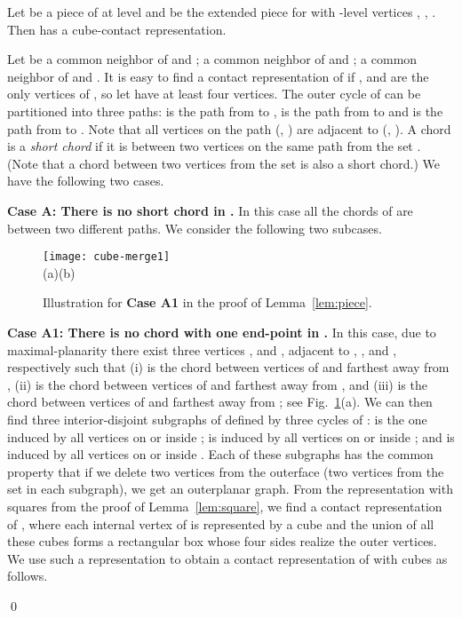 \documentclass{llncs}
\renewenvironment{proof}{\medskip\noindent{\bf Proof:}}{\mbox{}\hfill\qed\par}
\begin{document}
\begin{lemma}
	\label{lem:piece} Let  be a piece of  at level  and  be the
	extended piece for  with -level vertices , , . Then  has a
	cube-contact representation.
\end{lemma}
\begin{proof} Let  be a common neighbor of  and ;  a common neighbor of 
 and ;  a common neighbor of  and . It is easy to find a contact
 representation of  if ,  and  are the only vertices of
 , so let
  have at least four vertices. The outer cycle of  can be
 partitioned into three paths:  is the path from  to ,  is the path from  to
  and  is the path from  to . Note that all vertices on the path  (,
 ) are adjacent to  (, ). A chord  is a \textit{short chord} if it is between
 two vertices on the same path from the set . (Note that a chord between two
 vertices from the set  is also a short chord.) We have the following two cases.

\smallskip\noindent
\textbf{Case A: There is no short chord in .} In this case all the chords of  are between two
 different paths. We consider the following two subcases.




\begin{figure}[tb]
\centering
	\texttt{[image: cube-merge1]}\\
	(a)\hspace{0.38\textwidth}(b)\hspace{0.05\textwidth}
	\caption{Illustration for \textbf{Case A1} in the proof of Lemma~\ref{lem:piece}.}
	\label{fig:cube-merge1}
\end{figure}


\textbf{Case A1: There is no chord with one end-point in .} In this case, due to
 maximal-planarity there exist three vertices ,  and , adjacent to , , and ,
 respectively such that (i)  is the chord between vertices of  and  farthest
 away from , (ii)  is the chord between vertices of  and  farthest away
 from , and (iii)  is the chord between vertices of  and  farthest away
 from ; see Fig.~\ref{fig:cube-merge1}(a). We can then find three interior-disjoint
 subgraphs of  defined by three
cycles of :  is the one induced by
 all vertices on or inside ;  is induced by all vertices on or inside ;
 and  is induced by all vertices on or inside . Each of these subgraphs
 has the common property that if we delete two vertices from the outerface (two vertices from
 the set  in each subgraph), we get an outerplanar graph.
From the representation with squares from the proof of Lemma~\ref{lem:square}, we find a contact
 representation of ,  where each internal vertex of  is represented by a cube
 and the union of all these cubes forms a rectangular box whose four sides realize the outer vertices.
 We use such a representation to obtain a contact representation of  with cubes as follows.






\end{proof}
\end{document}
